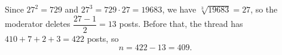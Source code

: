 Since $27^2=729$ and $27^3=729\cdot27=19683$, we have $\sqrt[3]{19683}=27$, so the moderator deletes $\dfrac{27-1}{2}=13$ posts. Before that, the thread has $410+7+2+3=422$ posts, so
\[n=422-13=\boxed{409}.\]
